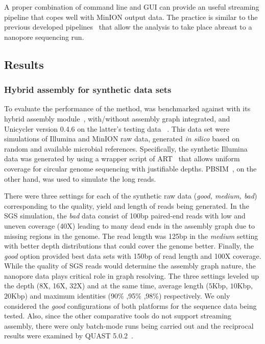 A proper combination of command line and GUI can provide an useful streaming pipeline that copes well with MinION output data. The practice is similar to the previous developed pipelines~\cite{CaoGC2016,Cao2017scaffolding,Nguyen2017barcode} that allow the analysis to take place abreast to a nanopore sequencing run.
\subsection{Results}
\subsubsection{Hybrid assembly for synthetic data sets}
To evaluate the performance of the method, \npgraph{} was benchmarked against \spades{} with its hybrid assembly module~\cite{AntipovKM2015}, \npscarf{} with/without assembly graph integrated, and Unicycler version 0.4.6 on the latter's testing data~ \cite{Wick2017unicycler} . This data set were simulations of Illumina and MinION raw data, generated \emph{in silico} based on random and available microbial references. 
Specifically, the synthetic Illumina data was generated by using a wrapper script of ART~\cite{HuangLMM2012} that allows uniform coverage for circular genome sequencing with justifiable depths.
PBSIM~\cite{OnoAH2012}, on the other hand, was used to simulate the long reads.

There were three settings for each of the synthetic raw data (\emph{good, medium, bad}) corresponding to the quality, yield and length of reads being generated. 
In the SGS simulation, the \emph{bad} data consist of 100bp paired-end reads with low and uneven coverage (40X) leading to many dead ends in the assembly graph due to missing regions in the genome. 
The read length was 125bp in the \emph{medium} setting with better depth distributions that could cover the genome better. 
Finally, the \emph{good} option provided best data sets with 150bp of read length and 100X coverage.
While the quality of SGS reads would determine the assembly graph nature, the nanopore data plays critical role in graph resolving.
The three settings leveled up the depth (8X, 16X, 32X) and at the same time, average length ($5$Kbp, $10$Kbp, $20$Kbp) and maximum identities (90\% ,95\% ,98\%) respectively.
We only considered the \emph{good} configurations of both platforms for the sequence data being tested.
Also, since the other comparative tools do not support streaming assembly, there were only batch-mode runs being carried out and the reciprocal results were examined by QUAST 5.0.2~\cite{Mikheenko2018quast5}. 

